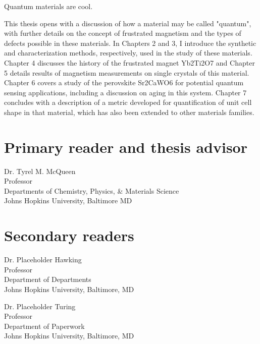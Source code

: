 

Quantum materials are cool.

This thesis opens with a discussion of how a material may be called "quantum", with further details on the concept of frustrated magnetism and the types of defects possible in these materials. In Chapters 2 and 3, I introduce the synthetic and characterization methods, respectively, used in the study of these materials. Chapter 4 discusses the history of the frustrated magnet Yb2Ti2O7 and Chapter 5 details results of magnetism measurements on single crystals of this material. Chapter 6 covers a study of the perovskite Sr2CaWO6 for potential quantum sensing applications, including a discussion on aging in this system. Chapter 7 concludes with a description of a metric developed for quantification of unit cell shape in that material, which has also been extended to other materials families.




\begin{singlespace}

    \section*{Primary reader and thesis advisor}
    
    Dr. Tyrel M. McQueen \\
    Professor\\
    Departments of Chemistry, Physics, & Materials Science\\
    Johns Hopkins University, Baltimore MD 


    \section*{Secondary readers}
    
    Dr. Placeholder Hawking\\
    Professor\\
    Department of Departments \\
    Johns Hopkins University, Baltimore, MD 
    
    \vspace{0.1in}
    
    Dr. Placeholder Turing \\
    Professor\\
    Department of Paperwork \\
    Johns Hopkins University, Baltimore, MD 



\end{singlespace}